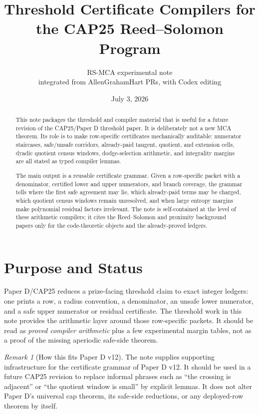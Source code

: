 \documentclass[11pt]{article}
\title{Threshold Certificate Compilers for the CAP25 Reed--Solomon Program}
\author{RS-MCA experimental note\\ \small integrated from AllenGrahamHart PRs, with Codex editing}
\date{July 3, 2026}
\theoremstyle{definition}
\theoremstyle{remark}
\newtheorem{remark}[theorem]{Remark}
\begin{document}
\maketitle

\begin{abstract}
This note packages the threshold and compiler material that is useful for a
future revision of the CAP25/Paper D threshold paper.  It is deliberately not a
new MCA theorem.  Its role is to make row-specific certificates mechanically
auditable: numerator staircases, safe/unsafe corridors, already-paid tangent,
quotient, and extension cells, dyadic quotient census windows, dodge-selection
arithmetic, and integrality margins are all stated as typed compiler lemmas.

The main output is a reusable certificate grammar.  Given a row-specific packet
with a denominator, certified lower and upper numerators, and branch coverage,
the grammar tells where the first safe agreement may lie, which already-paid
terms may be charged, which quotient census windows remain unresolved, and when
large entropy margins make polynomial residual factors irrelevant.  The note is
self-contained at the level of these arithmetic compilers; it cites the
Reed--Solomon and proximity background papers only for the code-theoretic
objects and the already-proved ledgers.
\end{abstract}

\section{Purpose and Status}

Paper D/CAP25 reduces a prize-facing threshold claim to exact integer ledgers:
one prints a row, a radius convention, a denominator, an unsafe lower numerator,
and a safe upper numerator or residual certificate.  The threshold work in this
note provides the arithmetic layer around those row-specific packets.  It should
be read as \emph{proved compiler arithmetic} plus a few experimental margin
tables, not as a proof of the missing aperiodic safe-side theorem.

\begin{remark}[How this fits Paper D v12]
The note supplies supporting infrastructure for the certificate grammar of
Paper D v12.  It should be used in a future CAP25 revision to replace informal
phrases such as ``the crossing is adjacent'' or ``the quotient window is small''
by explicit lemmas.  It does not alter Paper D's universal cap theorem, its
safe-side reductions, or any deployed-row theorem by itself.
\end{remark}
\end{document}
